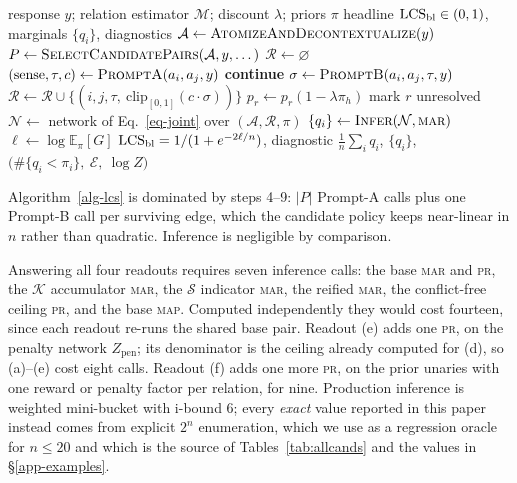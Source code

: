 \begin{algorithm}[t]
\caption{\textsc{ComputeLCS}$(y)$ --- the end-to-end coherence score.}
\label{alg-lcs}
\begin{algorithmic}[1]
\Require response $y$; relation estimator $\mathcal{M}$; discount $\lambda$; priors $\pi$
\Ensure headline $\mathrm{LCS}_{\mathrm{bl}}\in(0,1)$, marginals $\{q_i\}$, diagnostics
\State $\mathcal{A} \gets \textsc{AtomizeAndDecontextualize}(y)$
\State $P \gets \textsc{SelectCandidatePairs}(\mathcal{A}, y, \dots)$ 
\State $\mathcal{R} \gets \varnothing$
 
  \State $(\text{sense}, \tau, c) \gets \textsc{PromptA}(a_i,a_j,y)$ 
   \textbf{continue} \EndIf
  \State $\sigma \gets \textsc{PromptB}(a_i,a_j,\tau,y)$ 
  \State $\mathcal{R} \gets \mathcal{R} \cup \{(i,j,\tau,\ \mathrm{clip}_{[0,1]}(c\cdot\sigma))\}$
\EndFor
{}
   $p_r \gets p_r(1-\lambda\pi_h)$
  \Else{} mark $r$ unresolved \EndIf
\EndFor
\State $\mathcal{N} \gets$ network of Eq.~\ref{eq-joint} over $(\mathcal{A},\mathcal{R},\pi)$
\State $\{q_i\} \gets \textsc{Infer}(\mathcal{N}, \textsc{mar})$
\State $\ell \gets \log\mathbb{E}_\pi[G]$ 
\State \Return $\mathrm{LCS}_{\mathrm{bl}}=1/(1+e^{-2\ell/n})$, diagnostic $\tfrac1n\sum_i q_i$, $\{q_i\}$,
  $\bigl(\#\{q_i<\pi_i\},\ \mathcal{E},\ \log Z\bigr)$
\end{algorithmic}
\end{algorithm}

Algorithm~\ref{alg-lcs} is dominated by steps 4--9: $|P|$ Prompt-A calls plus one Prompt-B call per
surviving edge, which the candidate policy keeps near-linear in $n$ rather than quadratic. Inference
is negligible by comparison.

Answering all four readouts requires seven inference calls: the base \textsc{mar} and \textsc{pr},
the $\mathcal{K}$ accumulator \textsc{mar}, the $\mathcal{S}$ indicator \textsc{mar}, the reified
\textsc{mar}, the conflict-free ceiling \textsc{pr}, and the base \textsc{map}. Computed
independently they would cost fourteen, since each readout re-runs the shared base pair. Readout (e)
adds one \textsc{pr}, on the penalty network $Z_{\mathrm{pen}}$; its denominator is the ceiling
already computed for (d), so (a)--(e) cost eight calls. Readout (f) adds one more \textsc{pr}, on
the prior unaries with one reward or penalty factor per relation, for nine. Production
inference is weighted mini-bucket \citep{wmb} with i-bound $6$; every \emph{exact} value reported in
this paper instead comes from explicit $2^n$ enumeration, which we use as a regression oracle for
$n\le20$ and which is the source of Tables~\ref{tab:allcands} and the values in
\S\ref{app-examples}.


